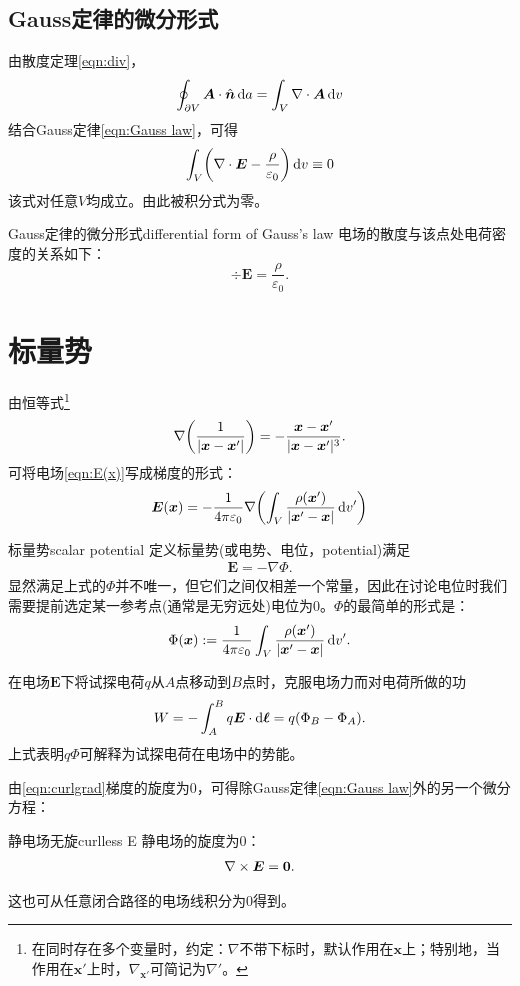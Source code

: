 \subsection{Gauss定律的微分形式}

由散度定理\eqref{eqn:div}，
\[
    \oint_{\partial V}\bm A\cdot\mathop{}\!\hat{\bm{n}}\mathop{}\!\mathrm{d} a=\int_V\nabla\cdot\bm A\mathop{}\!\mathrm{d} v
\]
结合Gauss定律\eqref{eqn:Gauss law}，可得
\[
    \int_V\biggl(\nabla\cdot\bm E-\frac\rho{\varepsilon_0}\biggr)\mathop{}\!\mathrm{d} v\equiv 0
\]
该式对任意$V$均成立。由此被积分式为零。
\begin{theorem}{Gauss定律的微分形式}{differential form of Gauss's law}
    电场的散度与该点处电荷密度的关系如下：
    \begin{equation}
        \label{eqn:divE}
        \div\bm E=\frac\rho{\varepsilon_0}.
    \end{equation}
\end{theorem}

\section{标量势}

由恒等式\footnote{在同时存在多个变量时，约定：$\nabla$不带下标时，默认作用在$\bm x$上；特别地，当作用在$\bm x'$上时，$\nabla_{\bm x'}$可简记为$\nabla'$。}
\[
    \nabla\biggl(\frac1{|\bm x-\bm x'|}\biggr)=-\frac{\bm x-\bm x'}{|\bm x-\bm x'|^3}.
\]
可将电场\eqref{eqn:E(x)}写成梯度的形式：
\[
    \bm E(\bm x)=-\frac1{4\pi\varepsilon_0}\nabla\biggl(\int_V\frac{\rho(\bm x')}{|\bm x'-\bm x|}\mathop{}\!\mathrm{d} v'\biggr)
\]
\begin{definition}{标量势}{scalar potential}
    定义标量势(或电势、电位，potential)满足
    \begin{align}
        \label{eqn:gradPhi}
        \bm E=-\nabla\Phi.
    \end{align}
    显然满足上式的$\Phi$并不唯一，但它们之间仅相差一个常量，因此在讨论电位时我们需要提前选定某一参考点(通常是无穷远处)电位为0。$\Phi$的最简单的形式是：
    \begin{align}
        \label{eqn:Phi-rho}
        \Phi(\bm x):=\frac1{4\pi\varepsilon_0}\int_V\frac{\rho(\bm x')}{|\bm x'-\bm x|}\mathop{}\!\mathrm{d} v'.
    \end{align}
\end{definition}

在电场$\bm E$下将试探电荷$q$从$A$点移动到$B$点时，克服电场力而对电荷所做的功
\[
    W=-\int_A^Bq\bm E\cdot\mathop{}\!\mathrm{d}\bm\ell=q(\Phi_B-\Phi_A).
\]
上式表明$q\Phi$可解释为试探电荷在电场中的势能。

由\eqref{eqn:curlgrad}梯度的旋度为0，可得除Gauss定律\eqref{eqn:Gauss law}外的另一个微分方程：
\begin{theorem}{静电场无旋}{curlless E}
    静电场的旋度为0：
    \begin{align}
        \label{eqn:curlE}
        \nabla\times\bm E=\bm 0.
    \end{align}
\end{theorem}
这也可从任意闭合路径的电场线积分为0得到。

